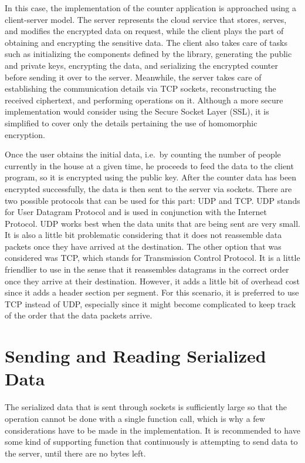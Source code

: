 In this case, the implementation of the counter application is approached using a client-server model. The server represents the cloud service that stores, serves, and modifies the encrypted data on request, while the client plays the part of obtaining and encrypting the sensitive data. The client also takes care of tasks such as initializing the components defined by the library, generating the public and private keys, encrypting the data, and serializing the encrypted counter before sending it over to the server. Meanwhile, the server takes care of establishing the communication details via TCP sockets, reconstructing the received ciphertext, and performing operations on it. Although a more secure implementation would consider using the Secure Socket Layer (SSL), it is simplified to cover only the details pertaining the use of homomorphic encryption.

Once the user obtains the initial data, i.e.\ by counting the number of people currently in the house at a given time, he proceeds to feed the data to the client program, so it is encrypted using the public key. After the counter data has been encrypted successfully, the data is then sent to the server via sockets. There are two possible protocols that can be used for this part: UDP and TCP. UDP stands for User Datagram Protocol and is used in conjunction with the Internet Protocol. UDP works best when the data units that are being sent are very small. It is also a little bit problematic considering that it does not reassemble data packets once they have arrived at the destination. The other option that was considered was TCP, which stands for Transmission Control Protocol. It is a little friendlier to use in the sense that it reassembles datagrams in the correct order once they arrive at their destination. However, it adds a little bit of overhead cost since it adds a header section per segment. For this scenario, it is preferred to use TCP instead of UDP, especially since it might become complicated to keep track of the order that the data packets arrive.

\section{{Sending and Reading Serialized Data}}

The serialized data that is sent through sockets is sufficiently large so that the operation cannot be done with a single function call, which is why a few considerations have to be made in the implementation. It is recommended to have some kind of supporting function that continuously is attempting to send data to the server, until there are no bytes left.

